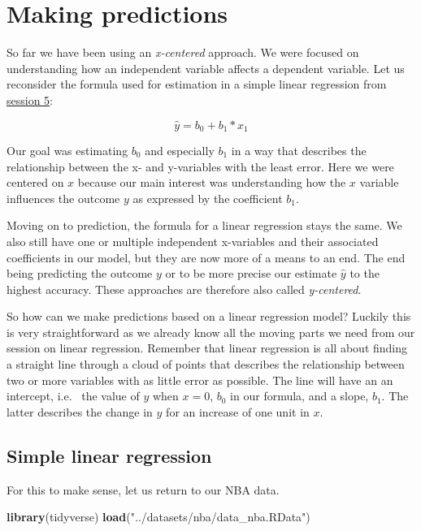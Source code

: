 \documentclass[
]{book}
\newenvironment{Shaded}{\begin{snugshade}}{\end{snugshade}}
\newcommand{\FunctionTok}[1]{\textcolor[rgb]{0.13,0.29,0.53}{\textbf{#1}}}
\newcommand{\NormalTok}[1]{#1}
\newcommand{\StringTok}[1]{\textcolor[rgb]{0.31,0.60,0.02}{#1}}
\begin{document}
\hypertarget{making-predictions}{%
\section{Making predictions}\label{making-predictions}}

So far we have been using an \emph{x-centered} approach. We were focused on
understanding how an independent variable affects a dependent variable.
Let us reconsider the formula used for estimation in a simple linear regression
from \protect\hyperlink{lin-t-1}{session 5}:

\[\hat{y} = b_0 +b_1*x_1\]

Our goal was estimating \(b_0\) and especially \(b_1\) in a way that describes the
relationship between the x- and y-variables with the least error. Here we were
centered on \(x\) because our main interest was understanding how the \(x\) variable
influences the outcome \(y\) as expressed by the coefficient \(b_1\).

Moving on to prediction, the formula for a linear regression stays the same.
We also still have one or multiple independent x-variables and
their associated coefficients in our model, but they are now more of a means to
an end. The end being predicting the outcome \(y\) or to be
more precise our estimate \(\hat{y}\) to the highest accuracy.
These approaches are therefore also called \emph{y-centered}.

So how can we make predictions based on a linear regression model?
Luckily this is very straightforward as we already know all the moving parts we
need from our session on linear regression.
Remember that linear regression is all about finding a straight line through a
cloud of points that describes the relationship between two or more variables
with as little error as possible. The line will have an an intercept, i.e.~
the value of \(y\) when \(x = 0\), \(b_0\) in our formula, and a slope, \(b_1\).
The latter describes the change in \(y\) for an increase of one unit in \(x\).

\hypertarget{simple-linear-regression-1}{%
\subsection{Simple linear regression}\label{simple-linear-regression-1}}

For this to make sense, let us return to our NBA data.

\begin{Shaded}
\begin{Highlighting}[]
\FunctionTok{library}\NormalTok{(tidyverse)}
\FunctionTok{load}\NormalTok{(}\StringTok{"../datasets/nba/data\_nba.RData"}\NormalTok{)}
\end{Highlighting}
\end{Shaded}
\end{document}
